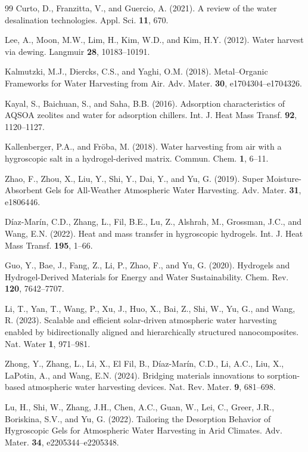 \documentclass[11pt]{article}
\begin{document}
\begin{thebibliography}{99}
 Curto, D., Franzitta, V., and Guercio, A. (2021). A review of the water desalination technologies. Appl. Sci. \textbf{11}, 670.

 Lee, A., Moon, M.W., Lim, H., Kim, W.D., and Kim, H.Y. (2012). Water harvest via dewing. Langmuir \textbf{28}, 10183--10191.

 Kalmutzki, M.J., Diercks, C.S., and Yaghi, O.M. (2018). Metal--Organic Frameworks for Water Harvesting from Air. Adv. Mater. \textbf{30}, e1704304--e1704326.

 Kayal, S., Baichuan, S., and Saha, B.B. (2016). Adsorption characteristics of AQSOA zeolites and water for adsorption chillers. Int. J. Heat Mass Transf. \textbf{92}, 1120--1127.

 Kallenberger, P.A., and Fr{\"o}ba, M. (2018). Water harvesting from air with a hygroscopic salt in a hydrogel-derived matrix. Commun. Chem. \textbf{1}, 6--11.

 Zhao, F., Zhou, X., Liu, Y., Shi, Y., Dai, Y., and Yu, G. (2019). Super Moisture-Absorbent Gels for All-Weather Atmospheric Water Harvesting. Adv. Mater. \textbf{31}, e1806446.

 D{\'i}az-Mar{\'i}n, C.D., Zhang, L., Fil, B.E., Lu, Z., Alshrah, M., Grossman, J.C., and Wang, E.N. (2022). Heat and mass transfer in hygroscopic hydrogels. Int. J. Heat Mass Transf. \textbf{195}, 1--66.

 Guo, Y., Bae, J., Fang, Z., Li, P., Zhao, F., and Yu, G. (2020). Hydrogels and Hydrogel-Derived Materials for Energy and Water Sustainability. Chem. Rev. \textbf{120}, 7642--7707.

 Li, T., Yan, T., Wang, P., Xu, J., Huo, X., Bai, Z., Shi, W., Yu, G., and Wang, R. (2023). Scalable and efficient solar-driven atmospheric water harvesting enabled by bidirectionally aligned and hierarchically structured nanocomposites. Nat. Water \textbf{1}, 971--981.

 Zhong, Y., Zhang, L., Li, X., El Fil, B., D{\'i}az-Mar{\'i}n, C.D., Li, A.C., Liu, X., LaPotin, A., and Wang, E.N. (2024). Bridging materials innovations to sorption-based atmospheric water harvesting devices. Nat. Rev. Mater. \textbf{9}, 681--698.

 Lu, H., Shi, W., Zhang, J.H., Chen, A.C., Guan, W., Lei, C., Greer, J.R., Boriskina, S.V., and Yu, G. (2022). Tailoring the Desorption Behavior of Hygroscopic Gels for Atmospheric Water Harvesting in Arid Climates. Adv. Mater. \textbf{34}, e2205344--e2205348.


\end{thebibliography}
\end{document}
